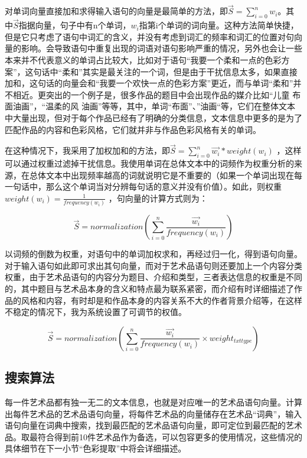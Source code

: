 对单词向量直接加和求得输入语句的向量是最简单的方法，即$\vec{S}=\sum_{i=0}^{n}{w_i}$。其中$\vec{S}$指据向量，句子中有n个单词，${w_i}$指第i个单词的词向量。\cite{DBLP:journals/corr/abs-1801-10198}这种方法简单快捷，但是它只考虑了语句中词汇的含义，并没有考虑到词汇的频率和词汇的位置对句向量的影响。会导致语句中重复出现的词语对语句影响严重的情况，另外也会让一些本来并不代表意义的单词占比较大，比如对于语句“我要一个柔和一点的色彩方案”，这句话中“柔和”其实是最关注的一个词，但是由于干扰信息太多，如果直接加和，这句话的向量会和“我要一个欢快一点的色彩方案”更近，而与单词“柔和”并不相近。更突出的一个例子是，很多作品的题目中会出现作品的媒介比如“儿童 布面油画”，“温柔的风 油画”等等，其中，单词“布面”、”油画“等，它们在整体文本中大量出现，但对于每个作品已经有了明确的分类信息，文本信息中更多的是为了匹配作品的内容和色彩风格，它们就并非与作品色彩风格有关的单词。

在这种情况下，我采用了加权加和的方法，即$ \vec{S} =\sum_{i=0}^{n}{ \vec{w_i}}*{weight(w_i)}$ ，这样可以通过权重过滤掉干扰信息。\cite{DBLP:journals/corr/abs-1708-00107}\cite{DBLP:journals/corr/abs-1801-10198}我使用单词在总体文本中的词频作为权重分析的来源，在总体文本中出现频率越高的词就说明它是不重要的（如果一个单词出现在每一句话中，那么这个单词当对分辨每句话的意义并没有价值）。如此，则权重$ weight(w_i)=\frac{1}{frequency(w_i)}$ ，句向量的计算方式则为：

$$ \vec{S} =normalization(\sum_{i=0}^{n}{ \frac{\vec{w_i}}{frequency(w_i)}})$$

以词频的倒数为权重，对语句中的单词加权求和，再经过归一化，得到语句向量。对于输入语句如此即可求出其句向量，而对于艺术品语句则还要加上一个内容分类权重，由于艺术品语句的内容分为题目、介绍和类型，三者表达信息的权重是不同的，其中题目与艺术品本身的含义和特点最为联系紧密，而介绍有时详细描述了作品的风格和内容，有时却是和作品本身的内容关系不大的作者背景介绍等，在这样不稳定的情况下，我为系统设置了可调节的权值。

$$ \vec{S} =normalization(\sum_{i=0}^{n}{ \frac{\vec{w_i}}{frequency(w_i)}\times weight_{txt type}})$$

\subsection{搜索算法}

每一件艺术品都有独一无二的文本信息，也就是对应唯一的艺术品语句向量。计算出每件艺术品的艺术品语句向量，将每件艺术品的向量储存在艺术品“词典”，输入语句向量在词典中搜索，找到最匹配的艺术品语句向量，即可定位到最匹配的艺术品。取最符合得到前10件艺术品作为备选，可以包容更多的使用情况，这些情况的具体细节在下一小节“色彩提取”中将会详细描述。\cite{zhang2009vector}


